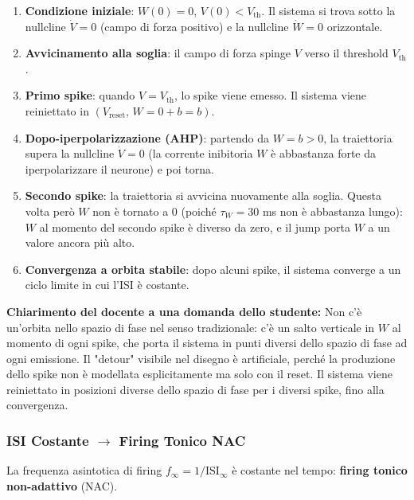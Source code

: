 \begin{enumerate}
    \item \textbf{Condizione iniziale}: $W(0) = 0$, $V(0) < V_{\text{th}}$. Il sistema si trova sotto la nullcline $\dot{V} = 0$ (campo di forza positivo) e la nullcline $\dot{W} = 0$ orizzontale.
    \item \textbf{Avvicinamento alla soglia}: il campo di forza spinge $V$ verso il threshold $V_{\text{th}}$.
    \item \textbf{Primo spike}: quando $V = V_{\text{th}}$, lo spike viene emesso. Il sistema viene reiniettato in $(V_{\text{reset}},\, W = 0 + b = b)$.
    \item \textbf{Dopo-iperpolarizzazione (AHP)}: partendo da $W = b > 0$, la traiettoria supera la nullcline $\dot{V} = 0$ (la corrente inibitoria $W$ è abbastanza forte da iperpolarizzare il neurone) e poi torna.
    \item \textbf{Secondo spike}: la traiettoria si avvicina nuovamente alla soglia. Questa volta però $W$ non è tornato a 0 (poiché $\tau_W = 30$ ms non è abbastanza lungo): $W$ al momento del secondo spike è diverso da zero, e il jump porta $W$ a un valore ancora più alto.
    \item \textbf{Convergenza a orbita stabile}: dopo alcuni spike, il sistema converge a un ciclo limite in cui l'ISI è costante.
\end{enumerate}

\begin{tcolorbox}[colback=gray!5, colframe=gray!40, arc=2mm, boxrule=0.5pt]
\textbf{Chiarimento del docente a una domanda dello studente:} Non c'è un'orbita nello spazio di fase nel senso tradizionale: c'è un salto verticale in $W$ al momento di ogni spike, che porta il sistema in punti diversi dello spazio di fase ad ogni emissione. Il "detour" visibile nel disegno è artificiale, perché la produzione dello spike non è modellata esplicitamente ma solo con il reset. Il sistema viene reiniettato in posizioni diverse dello spazio di fase per i diversi spike, fino alla convergenza.
\end{tcolorbox}

\subsubsection{ISI Costante $\rightarrow$ Firing Tonico NAC}

La frequenza asintotica di firing $f_\infty = 1/\text{ISI}_\infty$ è costante nel tempo: \textbf{firing tonico non-adattivo} (NAC).

